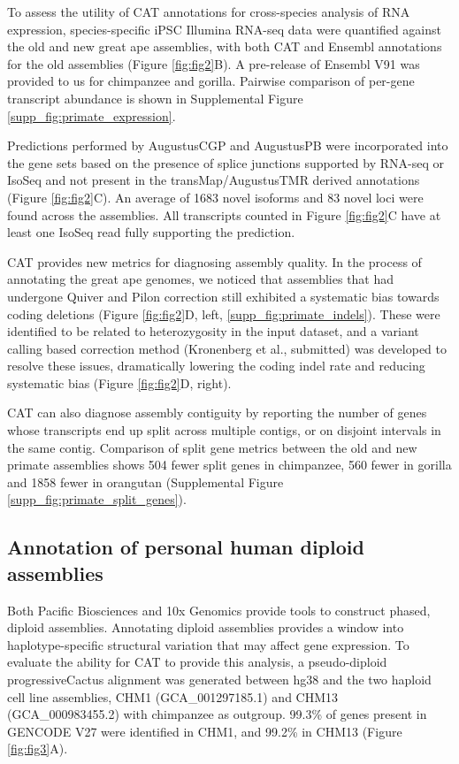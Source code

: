 \documentclass[fleqn,10pt]{wlscirep}
\begin{document}
To assess the utility of CAT annotations for cross-species analysis of RNA expression, species-specific iPSC Illumina RNA-seq data were quantified against the old and new great ape assemblies, with both CAT and Ensembl annotations for the old assemblies (Figure \ref{fig:fig2}B). A pre-release of Ensembl V91 was provided to us for chimpanzee and gorilla. Pairwise comparison of per-gene transcript abundance is shown in Supplemental Figure \ref{supp_fig:primate_expression}. 

Predictions performed by AugustusCGP and AugustusPB were incorporated into the gene sets based on the presence of splice junctions supported by RNA-seq or IsoSeq and not present in the transMap/AugustusTMR derived annotations (Figure \ref{fig:fig2}C). An average of 1683 novel isoforms and 83 novel loci were found across the assemblies. All transcripts counted in Figure \ref{fig:fig2}C have at least one IsoSeq read fully supporting the prediction.

CAT provides new metrics for diagnosing assembly quality. In the process of annotating the great ape genomes, we noticed that assemblies that had undergone Quiver and Pilon \cite{walker2014pilon} correction still exhibited a systematic bias towards coding deletions (Figure \ref{fig:fig2}D, left, \ref{supp_fig:primate_indels}). These were identified to be related to heterozygosity in the input dataset, and a variant calling based correction method (Kronenberg et al., submitted) was developed to resolve these issues, dramatically lowering the coding indel rate and reducing systematic bias (Figure \ref{fig:fig2}D, right). 

CAT can also diagnose assembly contiguity by reporting the number of genes whose transcripts end up split across multiple contigs, or on disjoint intervals in the same contig. Comparison of split gene metrics between the old and new primate assemblies shows 504 fewer split genes in chimpanzee, 560 fewer in gorilla and 1858 fewer in orangutan (Supplemental Figure \ref{supp_fig:primate_split_genes}).


\subsection{Annotation of personal human diploid assemblies}
Both Pacific Biosciences \cite{chin2016phased,huddleston2016discovery} and 10x Genomics \cite{Weisenfeld070425} provide tools to construct phased, diploid assemblies. Annotating diploid assemblies provides a window into haplotype-specific structural variation that may affect gene expression. To evaluate the ability for CAT to provide this analysis, a pseudo-diploid progressiveCactus alignment was generated between hg38 and the two haploid cell line assemblies, CHM1 (GCA\_001297185.1) and CHM13 (GCA\_000983455.2) with chimpanzee as outgroup. 99.3\% of genes present in GENCODE V27 were identified in CHM1, and 99.2\% in CHM13 (Figure \ref{fig:fig3}A). 
    
\end{document}
